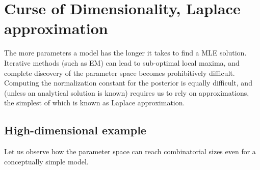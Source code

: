 \section{Curse of Dimensionality, Laplace approximation}
The more parameters a model has the longer it takes to find a MLE solution. Iterative methods (such as EM) can lead to sub-optimal local maxima, and complete discovery of the parameter space becomes prohibitively difficult. Computing the normalization constant for the  posterior is equally difficult, and (unless an analytical solution is known) requires us to rely on approximations, the simplest of which is known as Laplace approximation.

\subsection{High-dimensional example}
Let us observe how the parameter space can reach combinatorial sizes even for a conceptually simple model.
